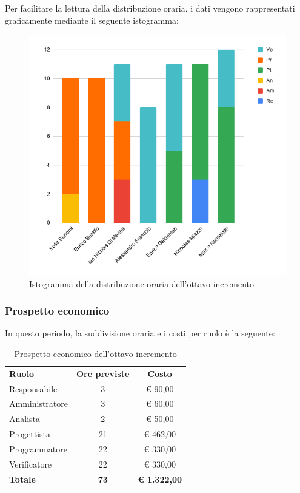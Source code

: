 \documentclass[../piano-di-progetto.tex]{subfiles}
\begin{document}
  Per facilitare la lettura della distribuzione oraria, i dati vengono rappresentati graficamente mediante il seguente istogramma:
  \begin{figure}[H]
    \centering
    \includegraphics[width=12cm]{img/ore-8-incr.png}
    \caption{Istogramma della distribuzione oraria dell'ottavo incremento}
    \label{fig:ore-componente-progettazione}
  \end{figure}

  \subsubsection{Prospetto economico}
  In questo periodo, la suddivisione oraria e i costi per ruolo è la seguente:

  \begin{table}[H]
    \centering
    \begin{tabular}{lcc}
      \rowcolor{lightgray}
      \textbf{Ruolo}  & \textbf{Ore previste} & \textbf{Costo}      \\
Responsabile    & 3                     & € 90,00             \\
Amministratore  & 3                     & € 60,00             \\
Analista        & 2                     & € 50,00             \\
Progettista     & 21                    & € 462,00            \\
Programmatore   & 22                    & € 330,00            \\
Verificatore    & 22                    & € 330,00            \\
\textbf{Totale} & \textbf{73}           & \textbf{€ 1.322,00}
    \end{tabular}
    \caption{Prospetto economico dell'ottavo incremento}
  \end{table}
\end{document}

